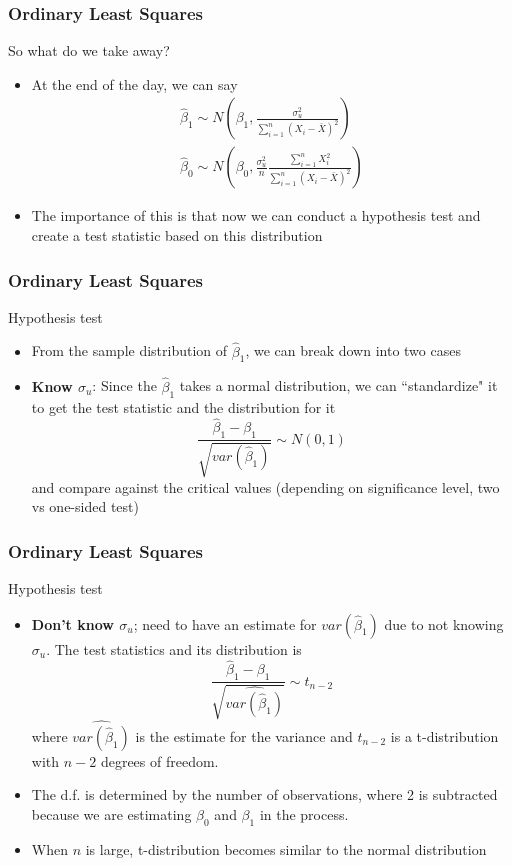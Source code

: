 \documentclass[compress]{beamer}
\begin{document}
\begin{frame}
\frametitle{Ordinary Least Squares}
So what do we take away?
\begin{itemize}
\item At the end of the day, we can say
\begin{gather*}
 \hat{\beta}_1 \sim N\left(\beta_1, \frac{\sigma_u^2}{\sum_{i=1}^n(X_i-\bar{X})^2}\right) \\
\hat{\beta}_0 \sim N\left(\beta_0, \frac{\sigma_u^2}{n}\frac{\sum_{i=1}^nX_i^2}{\sum_{i=1}^n(X_i-\bar{X})^2}\right)
\end{gather*}
\item The importance of this is that now we can conduct a hypothesis test and create a test statistic based on this distribution
\end{itemize}
\end{frame}

\begin{frame}
\frametitle{Ordinary Least Squares}
Hypothesis test
\begin{itemize}
\item From the sample distribution of $\hat{\beta}_1$, we can break down into two cases
\item \textbf{Know $\sigma_u$}: Since the $\hat{\beta}_1$ takes a normal distribution, we can ``standardize" it to get the test statistic and the distribution for it
\[
\frac{\hat{\beta}_1-\beta_1}{\sqrt{var(\hat{\beta}_1)}}\sim N(0,1)
\]
and compare against the critical values (depending on significance level, two vs one-sided test)
\end{itemize}
\end{frame}

\begin{frame}
\frametitle{Ordinary Least Squares}
Hypothesis test
\begin{itemize}
\item \textbf{Don't know $\sigma_u$}; need to have an estimate for $var(\hat{\beta}_1)$ due to not knowing $\sigma_u$. The test statistics and its distribution is
\[
\frac{\hat{\beta}_1-\beta_1}{\sqrt{\widehat{var(\hat{\beta}_1)}}}\sim t_{n-2}
\]
where $\widehat{var(\hat{\beta}_1)}$ is the estimate for the variance and $t_{n-2}$ is a t-distribution with $n-2$ degrees of freedom.
\item The d.f. is determined by the number of observations, where 2 is subtracted because we are estimating $\beta_0$ and $\beta_1$ in the process.
\item When $n$ is large, t-distribution becomes similar to the normal distribution
\end{itemize}
\end{frame}
\end{document}
